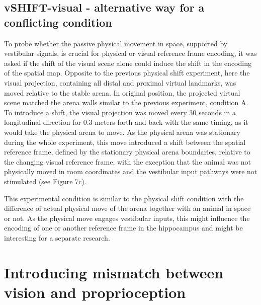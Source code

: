 \subsection{vSHIFT-visual - alternative way for a conflicting condition}

To probe whether the passive physical movement in space, supported by vestibular signals, is crucial for physical or visual reference frame encoding, it was asked if the shift of the visual scene alone could induce the shift in the encoding of the spatial map. Opposite to the previous physical shift experiment, here the visual projection, containing all distal and proximal virtual landmarks, was moved relative to the stable arena. In original position, the projected virtual scene matched the arena walls similar to the previous experiment, condition A. To introduce a shift, the visual projection was moved every 30 seconds in a longitudinal direction for 0.3 meters forth and back with the same timing, as it would take the physical arena to move. As the physical arena was stationary during the whole experiment, this move introduced a shift between the spatial reference frame, defined by the stationary physical arena boundaries, relative to the changing visual reference frame, with the exception that the animal was not physically moved in room coordinates and the vestibular input pathways were not stimulated (see Figure 7c).

This experimental condition is similar to the physical shift condition with the difference of actual physical move of the arena together with an animal in space or not. As the physical move engages vestibular inputs, this might influence the encoding of one or another reference frame in the hippocampus and might be interesting for a separate research.


\section{Introducing mismatch between vision and proprioception}
\label{sec:mismatch_gain}


